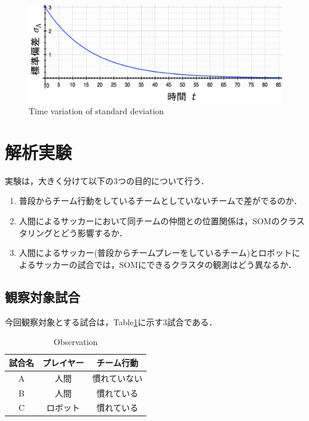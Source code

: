 \clearpage %

\begin{figure}[ht]
  \begin{center}
  
    \includegraphics[clip,width=15.0cm]{figure/Time_variation_of_standard_deviation.eps}
    \caption{Time variation of standard deviation}
    \label{fig:Time variation of standard deviation}
    
  \end{center}
\end{figure}

\clearpage%





\section{解析実験}
実験は，大きく分けて以下の3つの目的について行う．

\begin{enumerate}
  \item 普段からチーム行動をしているチームとしていないチームで差がでるのか．
  \item 人間によるサッカーにおいて同チームの仲間との位置関係は，SOMのクラスタリングとどう影響するか．
  \item 人間によるサッカー(普段からチームプレーをしているチーム)とロボットによるサッカーの試合では，SOMにできるクラスタの観測はどう異なるか． 
\end{enumerate}

\subsection{観察対象試合}
今回観察対象とする試合は，Table\ref{table1}に示す3試合である．

\begin{table}[htb]
	\begin{center}
	\caption{Observation}
	\begin{tabular}{|c|c|c|}\hline
		\label{table1}
	 	試合名 & プレイヤー & チーム行動  \\ \hline \hline
	 	A & 人間 & 慣れていない  \\
   	 	B & 人間 & 慣れている \\
   		C & ロボット & 慣れている \\ \hline
	\end{tabular}
	\end{center}
\end{table}

